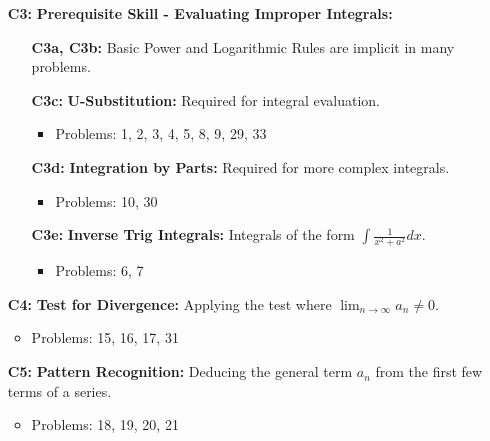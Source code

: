 \documentclass[12pt]{article}
\begin{document}
\begin{itemize}
    \item[\textbf{C3:}] \textbf{Prerequisite Skill - Evaluating Improper Integrals:}
        \begin{itemize}
            \item[\textbf{C3a, C3b:}] Basic Power and Logarithmic Rules are implicit in many problems.
            \item[\textbf{C3c:}] \textbf{U-Substitution:} Required for integral evaluation.
                \begin{itemize}
                    \item Problems: 1, 2, 3, 4, 5, 8, 9, 29, 33
                \end{itemize}
            \item[\textbf{C3d:}] \textbf{Integration by Parts:} Required for more complex integrals.
                \begin{itemize}
                    \item Problems: 10, 30
                \end{itemize}
            \item[\textbf{C3e:}] \textbf{Inverse Trig Integrals:} Integrals of the form $\int \frac{1}{x^2+a^2} dx$.
                \begin{itemize}
                    \item Problems: 6, 7
                \end{itemize}
        \end{itemize}

    \item[\textbf{C4:}] \textbf{Test for Divergence:} Applying the test where $\lim_{n \to \infty} a_n \neq 0$.
        \begin{itemize}
            \item Problems: 15, 16, 17, 31
        \end{itemize}
    
    \item[\textbf{C5:}] \textbf{Pattern Recognition:} Deducing the general term $a_n$ from the first few terms of a series.
        \begin{itemize}
            \item Problems: 18, 19, 20, 21
        \end{itemize}
\end{itemize}
\end{document}
